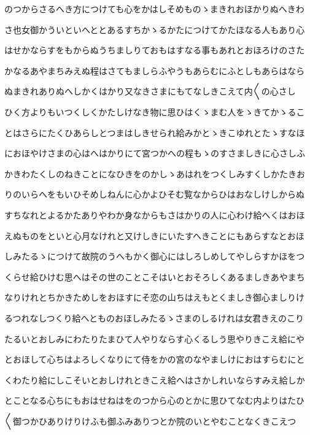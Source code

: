 \documentclass[a4paper,11pt,landscape]{ltjtarticle}
\begin{document}
\par\medskip
のつからさるへき方につけても心をかはしそめものゝまきれおほかりぬへきわ
\par\medskip
さ也女御かういといへととあるすちかゝるかたにつけてかたほなる人もあり心
\par\medskip
はせかならすをもからぬうちましりておもはすなる事もあれとおほろけのさた
\par\medskip
かなるあやまちみえぬ程はさてもましらふやうもあらむにふとしもあらはなら
\par\medskip
ぬまきれありぬへしかくはかり又なきさまにもてなしきこえて内〱の心さし
\par\medskip
ひく方よりもいつくしくかたしけなき物に思ひはくゝまむ人をゝきてかゝるこ
\par\medskip
とはさらにたくひあらしとつまはしきせられ給みかとゝきこゆれとたゝすなほ
\par\medskip
におほやけさまの心はへはかりにて宮つかへの程もゝのすさましきに心さしふ
\par\medskip
かきわたくしのねきことになひきをのかしゝあはれをつくしみすくしかたきお
\par\medskip
りのいらへをもいひそめしねんに心かよひそむ覧なからひはおなしけしからぬ
\par\medskip
すちなれとよるかたありやわか身なからもさはかりの人に心わけ給へくはおほ
\par\medskip
えぬものをといと心月なけれと又けしきにいたすへきことにもあらすなとおほ
\par\medskip
しみたるゝにつけて故院のうへもかく御心にはしろしめしてやしらすかほをつ
\par\medskip
くらせ給ひけむ思へはその世のことこそはいとおそろしくあるましきあやまち
\par\medskip
なりけれとちかきためしをおほすにそ恋の山ちはえもとくましき御心ましりけ
\par\medskip
るつれなしつくり給へとものおほしみたるゝさまのしるけれは女君きえのこり
\par\medskip
たるいとおしみにわたりたまひて人やりならす心くるしう思やりきこえ給にや
\par\medskip
とおほして心ちはよろしくなりにて侍をかの宮のなやましけにおはすらむにと
\par\medskip
くわたり給にしこそいとおしけれときこえ給へはさかしれいならすみえ給しか
\par\medskip
とことなる心ちにもおはせねはをのつから心のとかに思ひてなむ内よりはたひ
\par\medskip
〱御つかひありけりけふも御ふみありつとか院のいとやむことなくきこえつ
\end{document}
